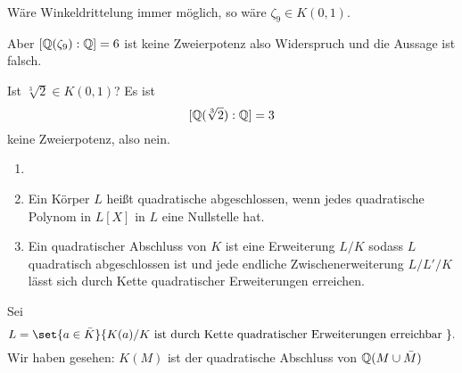 \begin{Kor}
	Wäre Winkeldrittelung immer möglich, so wäre \(\zeta_9\in K(0,1)\).
	\begin{center}\end{center}
	Aber \([\mathbb{Q}(\zeta_9):\mathbb{Q}]=6\) ist keine Zweierpotenz also Widerspruch und die Aussage ist falsch.
\end{Kor}
\begin{Kor}[Würfelverdoppelung]
	Ist \(\sqrt[3]{2}\in K(0,1)\)? Es ist \[[\mathbb{Q}(\sqrt[3]{2}):\mathbb{Q}]=3\] keine Zweierpotenz, also nein.
	
\end{Kor}
\begin{Def}
	\begin{enumerate}
		\item[]
		\item Ein Körper \(L\) heißt quadratische abgeschlossen, wenn jedes quadratische Polynom in \(L[X]\) in \(L\) eine Nullstelle hat.
		\item Ein quadratischer Abschluss von \(K\) ist eine Erweiterung \(L/K\) sodass \(L\) quadratisch abgeschlossen ist und jede endliche Zwischenerweiterung \(L/L'/K\) lässt sich durch Kette quadratischer Erweiterungen erreichen.
	\end{enumerate}
\end{Def}
\begin{Bem}
	Sei \[L=\set{a\in\bar K}{ K(a)/K \text{ ist durch Kette quadratischer Erweiterungen erreichbar }}.\]
	Wir haben gesehen: \(K(M)\) ist der quadratische Abschluss von \(\mathbb{Q}(M\cup\bar M)\)
\end{Bem}
